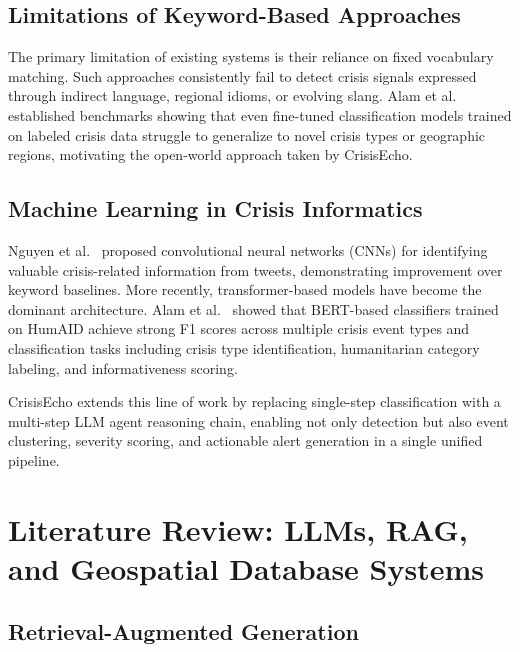 \documentclass[conference]{IEEEtran}
\begin{document}
\subsection{Limitations of Keyword-Based Approaches}

The primary limitation of existing systems is their reliance on fixed vocabulary
matching. Such approaches consistently fail to detect crisis signals expressed
through indirect language, regional idioms, or evolving slang. Alam et
al.~\cite{alam2021humaid} established benchmarks showing that even fine-tuned
classification models trained on labeled crisis data struggle to generalize to
novel crisis types or geographic regions, motivating the open-world approach
taken by CrisisEcho.

\subsection{Machine Learning in Crisis Informatics}

Nguyen et al.~\cite{nguyen2017robust} proposed convolutional neural networks
(CNNs) for identifying valuable crisis-related information from tweets,
demonstrating improvement over keyword baselines. More recently, transformer-based
models have become the dominant architecture. Alam et al.~\cite{alam2021humaid}
showed that BERT-based classifiers trained on HumAID achieve strong F1 scores
across multiple crisis event types and classification tasks including crisis
type identification, humanitarian category labeling, and informativeness scoring.

CrisisEcho extends this line of work by replacing single-step classification
with a multi-step LLM agent reasoning chain, enabling not only detection but
also event clustering, severity scoring, and actionable alert generation in a
single unified pipeline.

\section{Literature Review: LLMs, RAG, and Geospatial Database Systems}

\subsection{Retrieval-Augmented Generation}
\end{document}

